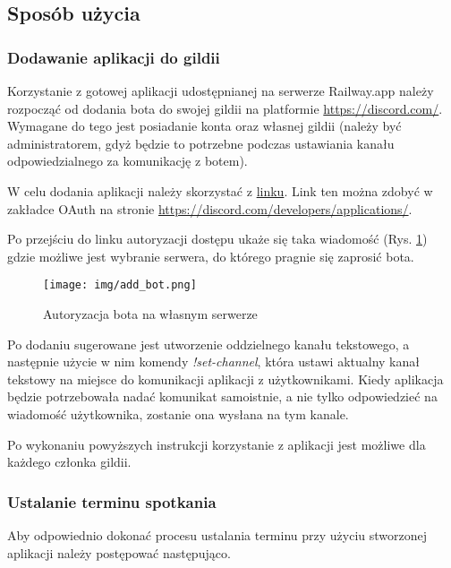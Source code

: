 \documentclass[11pt,a4paper]{article}
\begin{document}
\subsection{Sposób użycia}

\subsubsection{Dodawanie aplikacji do gildii}

Korzystanie z gotowej aplikacji udostępnianej na serwerze Railway.app należy rozpocząć od dodania bota do swojej gildii na platformie \href{https://discord.com/}{https://discord.com/}. Wymagane do tego jest posiadanie konta oraz własnej gildii (należy być administratorem, gdyż będzie to potrzebne podczas ustawiania kanału odpowiedzialnego za komunikację z botem). 

W celu dodania aplikacji należy skorzystać z \href{https://discordapp.com/oauth2/authorize?&client_id=1137322028643393587&scope=bot}{linku}. Link ten można zdobyć w zakładce OAuth na stronie \href{https://discord.com/developers/applications/}{https://discord.com/developers/applications/}.

Po przejściu do linku autoryzacji dostępu ukaże się taka wiadomość (Rys. \ref{img: add bot}) gdzie możliwe jest wybranie serwera, do którego pragnie się zaprosić bota.

\begin{figure}[H]
    \centering
    \texttt{[image: img/add\_bot.png]}
    \caption{Autoryzacja bota na własnym serwerze}
    \label{img: add bot}
\end{figure}

Po dodaniu sugerowane jest utworzenie oddzielnego kanału tekstowego, a następnie użycie w nim komendy \textit{!set-channel}, która ustawi aktualny kanał tekstowy na miejsce do komunikacji aplikacji z użytkownikami. Kiedy aplikacja będzie potrzebowała nadać komunikat samoistnie, a nie tylko odpowiedzieć na wiadomość użytkownika, zostanie ona wysłana na tym kanale.

Po wykonaniu powyższych instrukcji korzystanie z aplikacji jest możliwe dla każdego członka gildii. 

\subsubsection{Ustalanie terminu spotkania}

Aby odpowiednio dokonać procesu ustalania terminu przy użyciu stworzonej aplikacji należy postępować następująco.
\end{document}
